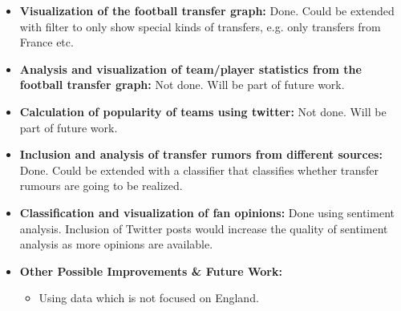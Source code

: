 \documentclass{article}
\begin{document}
\begin{itemize}
\item \textbf{Visualization of the football transfer graph:} Done. Could be extended with filter to only show special kinds of transfers, e.g. only transfers from France etc.
\item \textbf{Analysis and visualization of team/player statistics from the football transfer graph:} Not done. Will be part of future work.
\item \textbf{Calculation of popularity of teams using twitter:} Not done. Will be part of future work.
\item \textbf{Inclusion and analysis of transfer rumors from different sources:} Done. Could be extended with a classifier that classifies whether transfer rumours are going to be realized.	
\item \textbf{Classification and visualization of fan opinions:} Done using sentiment analysis. Inclusion of Twitter posts would increase the quality of sentiment analysis as more opinions are available.
\item \textbf{Other Possible Improvements \& Future Work:}
\begin{itemize}
	\item Using data which is not focused on England. 
\end{itemize}
\end{itemize}


\end{document}
